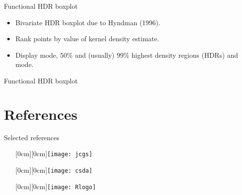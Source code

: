 \documentclass[14pt]{beamer}
\begin{document}
\begin{frame}{Functional HDR boxplot}\vspace*{-0.4cm}
\begin{itemize}\itemsep=0cm
\item Bivariate HDR boxplot due to Hyndman (1996).
\item Rank points by value of kernel density estimate.
\item Display mode, 50\% and (usually) 99\% highest density regions (HDRs) and mode.
\end{itemize}


\vspace*{10cm}
\end{frame}


\begin{frame}{Functional HDR boxplot}
\end{frame}



\section{References}

\begin{frame}{Selected references} %

\begin{itemize}
\item[{\raisebox{-1.2cm}[0cm][0cm]{\texttt{[image: jcgs]}}}] 
\item[{\raisebox{-1.15cm}[0cm][0cm]{\texttt{[image: csda]}}}] 
\item[{\raisebox{-.481cm}[0cm][0cm]{\texttt{[image: Rlogo]}}}] 
\end{itemize}

\end{frame}
\end{document}
